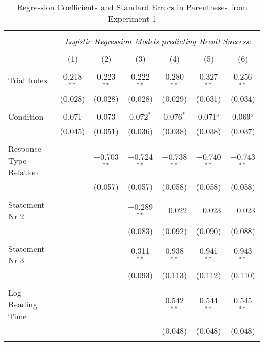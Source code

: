 
\begin{table}
\centering
  \caption{Regression Coefficients and Standard Errors in Parentheses from Experiment 1}
  \label{table:main}
\small
\renewcommand{\arraystretch}{0.45}
\begin{tabular}{@{\extracolsep{5pt}}lcccccc}
\\[-1.8ex]\hline
\hline \\[-1.8ex]
 & \multicolumn{6}{c}{\textit{Logistic Regression Models predicting Recall Success:}} \\
\cline{2-7}
\\[-1.8ex] & (1) & (2) & (3) & (4) & (5) & (6)\\
\hline \\[-1.8ex]
 Trial Index & 0.218$^{**}$ & 0.223$^{**}$ & 0.222$^{**}$ & 0.280$^{**}$ & 0.327$^{**}$ & 0.256$^{**}$ \\
  & (0.028) & (0.028) & (0.028) & (0.029) & (0.031) & (0.034) \\
  & & & & & & \\
 Condition & 0.071 & 0.073 & 0.072$^{*}$ & 0.076$^{*}$ & 0.071$^{o}$ & 0.069$^{o}$ \\
  & (0.045) & (0.051) & (0.036) & (0.038) & (0.038) & (0.037) \\
  & & & & & & \\
 Response Type Relation &  & $-$0.703$^{**}$ & $-$0.724$^{**}$ & $-$0.738$^{**}$ & $-$0.740$^{**}$ & $-$0.743$^{**}$ \\
  &  & (0.057) & (0.057) & (0.058) & (0.058) & (0.058) \\
  & & & & & & \\
 Statement Nr 2 &  &  & $-$0.289$^{**}$ & $-$0.022 & $-$0.023 & $-$0.023 \\
  &  &  & (0.083) & (0.092) & (0.090) & (0.088) \\
  & & & & & & \\
 Statement Nr 3 &  &  & 0.311$^{**}$ & 0.938$^{**}$ & 0.941$^{**}$ & 0.943$^{**}$ \\
  &  &  & (0.093) & (0.113) & (0.112) & (0.110) \\
  & & & & & & \\
 Log Reading Time &  &  &  & 0.542$^{**}$ & 0.544$^{**}$ & 0.545$^{**}$ \\
  &  &  &  & (0.048) & (0.048) & (0.048) \\
  & & & & & & \\

\end{tabular}
\end{table}
